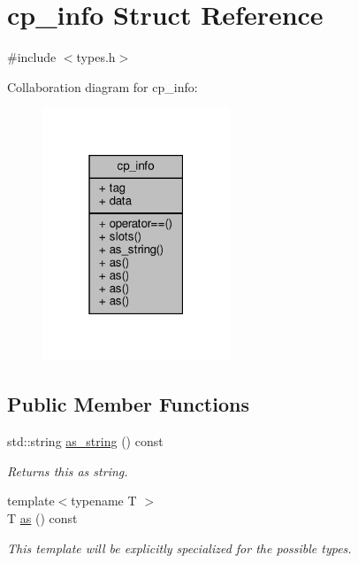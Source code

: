 \hypertarget{structcp__info}{}\section{cp\+\_\+info Struct Reference}
\label{structcp__info}


{\ttfamily \#include $<$types.\+h$>$}



Collaboration diagram for cp\+\_\+info\+:
\nopagebreak
\begin{figure}[H]
\begin{center}
\leavevmode
\includegraphics[width=159pt]{structcp__info__coll__graph}
\end{center}
\end{figure}
\subsection*{Public Member Functions}
\begin{DoxyCompactItemize}
\item 
\mbox{\label{structcp__info_a8bdd7454a673dea621f24569c4c6aa01}} 
std\+::string \hyperlink{structcp__info_a8bdd7454a673dea621f24569c4c6aa01}{as\+\_\+string} () const
\begin{DoxyCompactList}\small\item\em Returns {\itshape this} as string. \end{DoxyCompactList}\item 
\mbox{\label{structcp__info_a73e88cec575d05a03d73cbfcc91cd71b}} 
{\footnotesize template$<$typename T $>$ }\\T \hyperlink{structcp__info_a73e88cec575d05a03d73cbfcc91cd71b}{as} () const
\begin{DoxyCompactList}\small\item\em This template will be explicitly specialized for the possible types. \end{DoxyCompactList}\end{DoxyCompactItemize}



